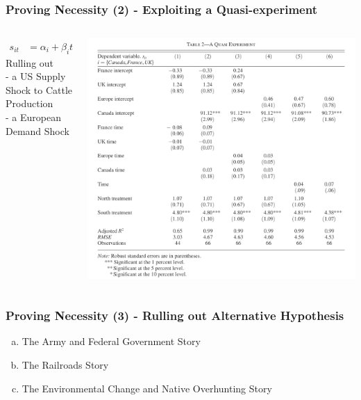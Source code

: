 \documentclass[aspectratio=169, 12pt, final]{beamer}
\begin{document}
\begin{frame}
\frametitle{Proving Necessity (2) - Exploiting a Quasi-experiment}
\begin{columns}
\begin{column}{0.3\textwidth}
\begin{align*}
	s_{it} &= \alpha_i + \beta_i t + \gamma T_{it}^S + \delta T_{it}^N + \epsilon_{it}
 \end{align*}	
\footnotesize{
Rulling out \\
- a US Supply Shock to Cattle Production
\\
- a European Demand Shock}
\end{column}
\begin{column}{0.7\textwidth}
\begin{center}
\includegraphics[width=0.9\textheight]{Table2.jpeg}
\end{center}	
\end{column}
\end{columns}
\end{frame}



\begin{frame}
\frametitle{Proving Necessity (3) - Rulling out Alternative Hypothesis}
\begin{enumerate}[a)]
	\item The Army and Federal Government Story
	\item The Railroads Story
	\item The Environmental Change and Native Overhunting Story
\end{enumerate}
\end{frame}
\end{document}
